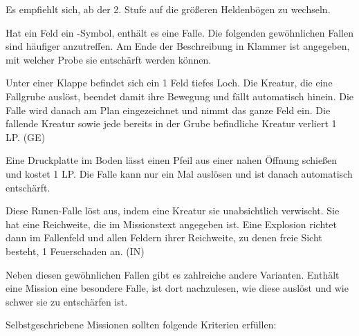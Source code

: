 {			\noindent
			Es empfiehlt sich, ab der 2. Stufe auf die größeren Heldenbögen zu wechseln.


		Hat ein Feld ein \trap-Symbol, enthält es eine Falle. Die folgenden gewöhnlichen Fallen sind häufiger anzutreffen. Am Ende der Beschreibung in Klammer ist angegeben, mit welcher Probe sie entschärft werden können.

		 Unter einer Klappe befindet sich ein 1 Feld tiefes Loch. Die Kreatur, die eine Fallgrube auslöst, beendet damit ihre Bewegung und fällt automatisch hinein. Die Falle wird danach am Plan eingezeichnet und nimmt das ganze Feld ein. Die fallende Kreatur sowie jede bereits in der Grube befindliche Kreatur verliert 1 LP. (GE)

		 Eine Druckplatte im Boden lässt einen Pfeil aus einer nahen Öffnung schießen und kostet 1 LP. Die Falle kann nur ein Mal auslösen und ist danach automatisch entschärft.

		 Diese Runen-Falle löst aus, indem eine Kreatur sie unabsichtlich verwischt. Sie hat eine Reichweite, die im Missionstext angegeben ist. Eine Explosion richtet dann im Fallenfeld und allen Feldern ihrer Reichweite, zu denen freie Sicht besteht, 1 Feuerschaden an. (IN)

		Neben diesen gewöhnlichen Fallen gibt es zahlreiche andere Varianten. Enthält eine Mission eine besondere Falle, ist dort nachzulesen, wie diese auslöst und wie schwer sie zu entschärfen ist.

		Selbstgeschriebene Missionen sollten folgende Kriterien erfüllen:


}

